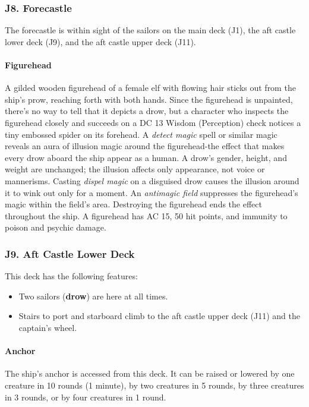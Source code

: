 \documentclass[10pt,a4paper,twoside,twocolumn,openany,nodeprecatedcode]{dndbook}
\begin{document}
\subsubsection{J8. Forecastle}
The forecastle is within sight of the sailors on the main deck (J1), the aft castle lower deck (J9), and the aft castle upper deck (J11).
\paragraph{Figurehead}
A gilded wooden figurehead of a female elf with flowing hair sticks out from the ship's prow, reaching forth with both hands. Since the figurehead is unpainted, there's no way to tell that it depicts a drow, but a character who inspects the figurehead closely and succeeds on a DC 13 Wisdom (Perception) check notices a tiny embossed spider on its forehead.
A \textit{detect magic} spell or similar magic reveals an aura of illusion magic around the figurehead-the effect that makes every drow aboard the ship appear as a human. A drow's gender, height, and weight are unchanged; the illusion affects only appearance, not voice or mannerisms. Casting \textit{dispel magic} on a disguised drow causes the illusion around it to wink out only for a moment. An \textit{antimagic field} suppresses the figurehead's magic within the field's area. Destroying the figurehead ends the effect throughout the ship. A figurehead has AC 15, 50 hit points, and immunity to poison and psychic damage.
\subsubsection{J9. Aft Castle Lower Deck}
This deck has the following features:
\begin{itemize}

\item Two sailors (\textbf{drow}) are here at all times.
\item Stairs to port and starboard climb to the aft castle upper deck (J11) and the captain's wheel.
\end{itemize}


\paragraph{Anchor}
The ship's anchor is accessed from this deck. It can be raised or lowered by one creature in 10 rounds (1 minute), by two creatures in 5 rounds, by three creatures in 3 rounds, or by four creatures in 1 round.
\end{document}
